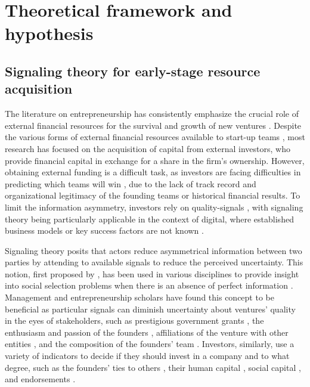 \documentclass[12pt]{article}
\begin{document}

\section{Theoretical framework and hypothesis}

\subsection{Signaling theory for early-stage resource acquisition}

The literature on entrepreneurship has consistently emphasize the crucial role of external financial resources for the survival and growth of new ventures \citep{cooper1994initial}. Despite the various forms of external financial resources available to start-up teams \citep{drover2017review, klein2020start}, most research has focused on the acquisition of capital from external investors, who provide financial capital in exchange for a share in the firm's ownership. However, obtaining external funding is a difficult task, as investors are facing difficulties in predicting which teams will win \citep{ghassemiautomated, duhigg2016google}, due to the lack of track record and organizational legitimacy of the founding teams or historical financial results. To limit the information asymmetry, investors rely on quality-signals \citep{spence1978job, ko2018signaling}, with signaling theory being particularly applicable in the context of digital, where established business models or key success factors are not known \citep{nambisan2017digital}.

Signaling theory posits that actors reduce asymmetrical information between two parties by attending to available signals to reduce the perceived uncertainty. This notion, first proposed by \citet{spence1974market}, has been used in various disciplines to provide insight into social selection problems when there is an absence of perfect information \citep{connelly2011signaling, colombo2021use}. Management and entrepreneurship scholars have found this concept to be beneficial as particular signals can diminish uncertainty about ventures' quality in the eyes of stakeholders, such as prestigious government grants \citep{islam2018signaling}, the enthusiasm and passion of the founders \citep{chen2009entrepreneur}, affiliations of the venture with other entities \citep{plummer2016better}, and the composition of the founders' team \citep{ko2018signaling}. Investors, similarly, use a variety of indicators to decide if they should invest in a company and to what degree, such as the founders' ties to others \citep{shane2002network}, their human capital \citep{beckman2007early}, social capital \citep{shane2002organizational}, and endorsements \citep{courtney2017resolving, janney2006moderating, plummer2016better}.
\end{document}
